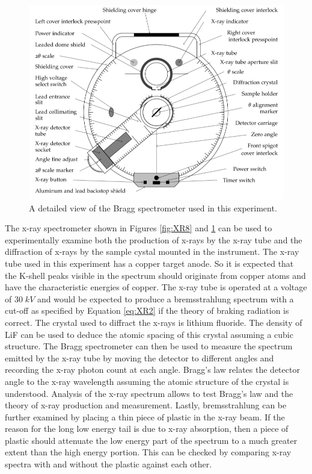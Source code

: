 \documentclass[12pt, a4paper, oneside, openright, titlepage]{book}
\begin{document}
\begin{figure}[H]
    \centering
    \includegraphics[scale = 0.8]{Images/XR9.PNG}
    \caption{ A detailed view of the Bragg spectrometer used in this experiment.}
    \label{fig:XR9}
\end{figure}

\noindent The x-ray spectrometer shown in Figures \ref{fig:XR8} and \ref{fig:XR9} can be used to experimentally examine both the production of x-rays by the x-ray tube and the diffraction of x-rays by the sample cystal mounted in the instrument. The x-ray tube used in this experiment has a copper target anode. So it is expected that the K-shell peaks visible in the spectrum should originate from copper atoms and have the characteristic energies of copper. The x-ray tube is operated at a voltage of $30 \;kV$ and would be expected to produce a bremsstrahlung spectrum with a cut-off as specified by Equation \ref{eq:XR2} if the theory of braking radiation is correct. The crystal used to diffract the x-rays is lithium fluoride. The density of LiF can be used to deduce the atomic spacing of this crystal assuming a cubic structure. The Bragg spectrometer can then be used to measure the spectrum emitted by the x-ray tube by moving the detector to different angles and recording the x-ray photon count at each angle. Bragg’s law relates the detector angle to the x-ray wavelength assuming the atomic structure of the crystal is understood. Analysis of the x-ray spectrum allows to test Bragg’s law and the theory of x-ray production and measurement. Lastly, bremsstrahlung can be further examined by placing a thin piece of plastic in the x-ray beam. If the reason for the long low energy tail is due to x-ray absorption, then a piece of plastic should attenuate the low energy part of the spectrum to a much greater extent than the high energy portion. This can be checked by comparing x-ray spectra with and without the plastic against each other.
\end{document}
